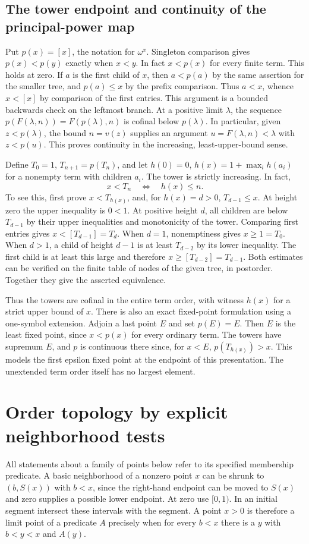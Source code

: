 \subsection{The tower endpoint and continuity of the principal-power map}
Put $p(x)=[x]$, the notation for $\omega^x$. Singleton comparison gives
$p(x)<p(y)$ exactly when $x<y$. In fact $x<p(x)$ for every finite
term. This holds at zero. If $a$ is the first child of $x$, then
$a<p(a)$ by the same assertion for the smaller tree, and $p(a)\le x$
by the prefix comparison. Thus $a<x$, whence $x<[x]$ by comparison
of the first entries. This argument is a bounded backwards check on the
leftmost branch. At a positive limit $\lambda$, the sequence
$p(F(\lambda,n))=F(p(\lambda),n)$ is cofinal below $p(\lambda)$.
In particular, given $z<p(\lambda)$, the bound $n=v(z)$ supplies an
argument $u=F(\lambda,n)<\lambda$ with $z<p(u)$. This proves
continuity in the increasing, least-upper-bound sense.

Define $T_0=1$, $T_{n+1}=p(T_n)$, and let $h(0)=0$,
$h(x)=1+\max_i h(a_i)$ for a nonempty term with children $a_i$.
The tower is strictly increasing. In fact,
\[
                 x<T_n\quad\Longleftrightarrow\quad h(x)\le n.
\]
To see this, first prove $x<T_{h(x)}$, and, for $h(x)=d>0$,
$T_{d-1}\le x$. At height zero the upper inequality is $0<1$.
At positive height $d$, all children are below $T_{d-1}$ by their
upper inequalities and monotonicity of the tower. Comparing first
entries gives $x<[T_{d-1}]=T_d$. When $d=1$, nonemptiness gives
$x\ge1=T_0$. When $d>1$, a child of height $d-1$ is at least
$T_{d-2}$ by its lower inequality. The first child is at least this
large and therefore $x\ge[T_{d-2}]=T_{d-1}$. Both estimates can be
verified on the finite table of nodes of the given tree, in postorder.
Together they give the asserted equivalence.

Thus the towers are cofinal in the entire term order, with witness
$h(x)$ for a strict upper bound of $x$. There is also an exact
fixed-point formulation using a one-symbol extension. Adjoin a last
point $E$ and set $p(E)=E$. Then $E$ is the least fixed point, since
$x<p(x)$ for every ordinary term. The towers have supremum $E$, and
$p$ is continuous there since, for $x<E$, $p(T_{h(x)})>x$. This models the
first epsilon fixed point at the endpoint of this presentation. The
unextended term order itself has no largest element.

\section{Order topology by explicit neighborhood tests}
\label{sec:ordtop}
All statements about a family of points below refer to its specified
membership predicate. A basic neighborhood of a nonzero point $x$ can
be shrunk to $(b,S(x))$ with $b<x$, since the right-hand endpoint can
be moved to $S(x)$ and zero supplies a possible lower endpoint.
At zero use $[0,1)$. In an initial segment intersect these intervals
with the segment. A point $x>0$ is therefore a limit point of a
predicate $A$ precisely when for every $b<x$ there is a $y$ with
$b<y<x$ and $A(y)$.

